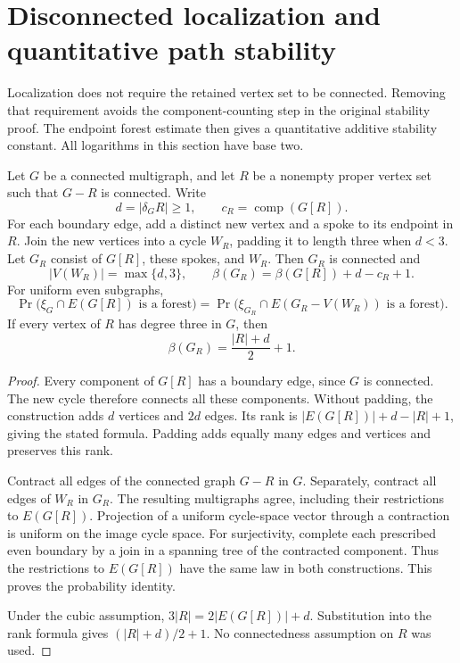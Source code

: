 \section{Disconnected localization and quantitative path stability}
\label{sec:path-quantitative-localization}

Localization does not require the retained vertex set to be connected.
Removing that requirement avoids the component-counting step in the original stability proof.
The endpoint forest estimate then gives a quantitative additive stability constant.
All logarithms in this section have base two.

\begin{lemma}
\label{lem:path-disconnected-localization}
Let $G$ be a connected multigraph, and let $R$ be a nonempty proper vertex set such that $G-R$ is connected.
Write
\[
 d=|\delta_G R|\ge1,\qquad c_R=\operatorname{comp}(G[R]).
\]
For each boundary edge, add a distinct new vertex and a spoke to its endpoint in $R$.
Join the new vertices into a cycle $W_R$, padding it to length three when $d<3$.
Let $G_R$ consist of $G[R]$, these spokes, and $W_R$.
Then $G_R$ is connected and
\[
 |V(W_R)|=\max\{d,3\},
 \qquad
 \beta(G_R)=\beta(G[R])+d-c_R+1.
\]
For uniform even subgraphs,
\[
 \Pr\bigl(\xi_G\cap E(G[R])\text{ is a forest}\bigr)
 =\Pr\bigl(\xi_{G_R}\cap E(G_R-V(W_R))\text{ is a forest}\bigr).
\]
If every vertex of $R$ has degree three in $G$, then
\[
 \beta(G_R)=\frac{|R|+d}{2}+1.
\]
\end{lemma}

\begin{proof}
Every component of $G[R]$ has a boundary edge, since $G$ is connected.
The new cycle therefore connects all these components.
Without padding, the construction adds $d$ vertices and $2d$ edges.
Its rank is $|E(G[R])|+d-|R|+1$, giving the stated formula.
Padding adds equally many edges and vertices and preserves this rank.

Contract all edges of the connected graph $G-R$ in $G$.
Separately, contract all edges of $W_R$ in $G_R$.
The resulting multigraphs agree, including their restrictions to $E(G[R])$.
Projection of a uniform cycle-space vector through a contraction is uniform on the image cycle space.
For surjectivity, complete each prescribed even boundary by a join in a spanning tree of the contracted component.
Thus the restrictions to $E(G[R])$ have the same law in both constructions.
This proves the probability identity.

Under the cubic assumption, $3|R|=2|E(G[R])|+d$.
Substitution into the rank formula gives $(|R|+d)/2+1$.
No connectedness assumption on $R$ was used.
\end{proof}

